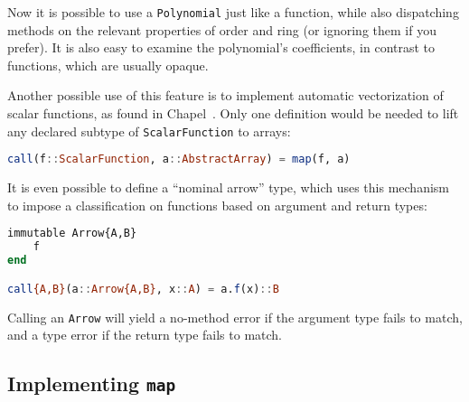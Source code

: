 \noindent
Now it is possible to use a \texttt{Polynomial} just like a function, while
also dispatching methods on the relevant properties of order and ring
(or ignoring them if you prefer).
It is also easy to examine the polynomial's coefficients, in contrast to
functions, which are usually opaque.


Another possible use of this feature is to implement automatic vectorization
of scalar functions, as found in Chapel~\cite{chamberlain2007parallel}.
Only one definition would be needed to lift any declared subtype of
\texttt{ScalarFunction} to arrays:

\begin{singlespace}
\begin{lstlisting}[language=julia]
call(f::ScalarFunction, a::AbstractArray) = map(f, a)
\end{lstlisting}
\end{singlespace}

It is even possible to define a ``nominal arrow'' type, which uses this
mechanism to impose a classification on functions based on argument and
return types:

\begin{samepage}
\begin{singlespace}
\begin{lstlisting}[language=julia]
immutable Arrow{A,B}
    f
end

call{A,B}(a::Arrow{A,B}, x::A) = a.f(x)::B
\end{lstlisting}
\end{singlespace}
\end{samepage}

\noindent
Calling an \texttt{Arrow} will yield a no-method error if the argument
type fails to match, and a type error if the return type fails to
match.





\subsection{Implementing \texttt{map}}

